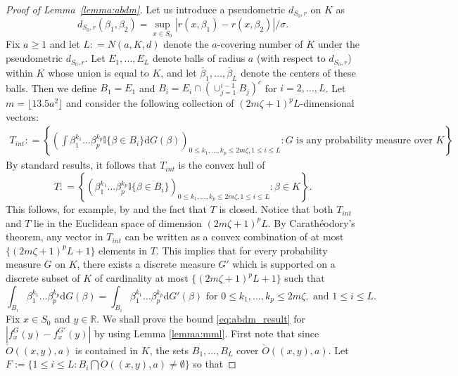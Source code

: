 \documentclass[11pt]{article}
\numberwithin{equation}{section}
\newcommand{\RS}{\mathbb{R}}
\newcommand{\dbeta}{d_{S_0,r}}
\begin{document}
\begin{appendices}
\begin{proof}[Proof of Lemma~\ref{lemma:abdm}]
Let us introduce a pseudometric $\dbeta$ on $K$ as
\begin{equation}
\dbeta(\beta_1,\beta_2) = \sup_{x \in S_0} | r(x,\beta_1) - r(x,\beta_2)|/\sigma.
\label{eq:amdm_metric}
\end{equation}
Fix $a \geq 1$ and let $L: = N(a,K,d)$ denote the $a$-covering number of $K$ under the pseudometric $\dbeta$.  
Let $E_1,\dots,E_L$ denote balls of radius $a$ (with respect to $\dbeta$) within $K$ whose union is equal to $K$, and let $\bar{\beta}_1,\dots, \bar{\beta}_L$ denote the centers of these balls. Then we define $B_1 = E_1$ and $B_i = E_i \cap (\cup_{j=1}^{i-1} B_j)^c$ for $i = 2,\dots,L$. Let $m  = \lfloor 13.5 a^2\rfloor$ and consider the following collection of $(2m\zeta+1)^pL$-dimensional vectors: 
\[
\begin{split}
T_{int}: = \left\{\left( \int \beta_1^{k_1}\dots \beta_p^{k_p}\mathbb{I}\{ \beta \in B_i\} \mathrm{d} G(\beta)\right)_{ 0 \leq k_1,\dots, k_p \leq2 m \zeta, 1\leq i \leq L} 
: G \text{ is any probability measure over } K\right\}.
\end{split}
\]
By standard results, it follows that $T_{int}$ is the convex hull of 
\[
T: = \left\{\left( \beta_1^{k_1}\dots \beta_p^{k_p}\mathbb{I}\{ \beta \in B_i\} \right)_{ 0 \leq k_1,\dots,k_p \leq2 m \zeta, 1\leq i \leq L}: \beta \in  K\right\}.
\]
This follows, for example, by \citet[Theorem 6.3]{parthasarathy2005probability} and the fact that $T$ is closed. 
Notice that both $T_{int}$ and $T$ lie in the Euclidean space of dimension $(2m\zeta +1)^pL$. By Carath\'eodory's theorem, any vector in $T_{int}$ can be written as a convex combination of at most $\{(2m\zeta +1)^pL+1\}$ elements in $T$. This implies that for every probability measure $G$ on $K$, there exists a discrete measure $G'$ which is supported on a discrete subset of $K$ of cardinality at most $\{(2m\zeta +1)^pL+1\}$ such that 
\begin{equation}\label{mmat}
\int_{B_i} \beta_1^{k_1}\dots \beta_p^{k_p} \mathrm{d} G(\beta) = \int_{B_i} \beta_1^{k_1}\dots \beta_p^{k_p} \mathrm{d} G'(\beta) \text{ for } 0 \leq k_1,\dots,k_p \leq 2m\zeta, \text{ and } 1 \leq i \leq L.
\end{equation}
Fix $x \in S_0$ and $y \in \RS$. We shall prove the bound \eqref{eq:abdm_result} for $|f_x^G(y) - f_{x}^{G'}(y)|$ by using Lemma \ref{lemma:mml}. First note that since $\mathring{O}((x,y),a)$ is contained in $K$, the sets $B_1,\dots,B_L$ cover $\mathring{O}((x,y),a)$. Let $F := \{  1\leq i \leq L:B_i \bigcap  \mathring{O}((x,y),a)\neq \emptyset\}$ so that 

\end{proof}
\end{appendices}
\end{document}
